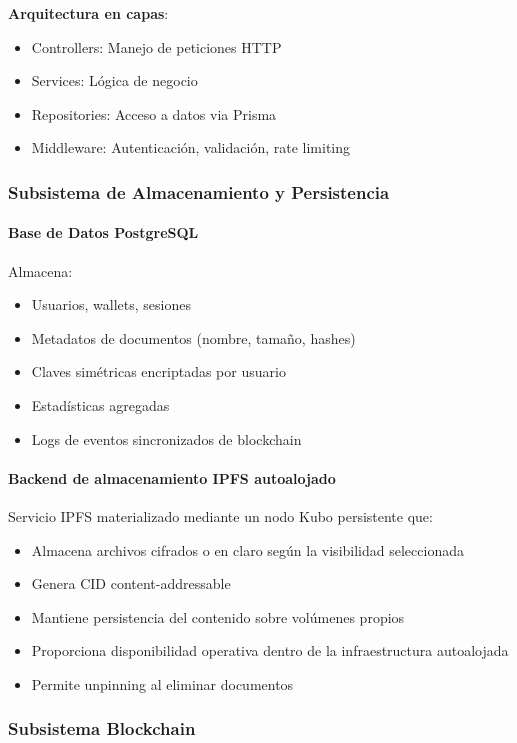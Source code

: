 \documentclass[11pt, a4paper]{article}
\begin{document}
\textbf{Arquitectura en capas}:
\begin{itemize}
    \item Controllers: Manejo de peticiones HTTP
    \item Services: Lógica de negocio
    \item Repositories: Acceso a datos via Prisma
    \item Middleware: Autenticación, validación, rate limiting
\end{itemize}

\subsubsection{Subsistema de Almacenamiento y Persistencia}

\paragraph{Base de Datos PostgreSQL}
Almacena:
\begin{itemize}
    \item Usuarios, wallets, sesiones
    \item Metadatos de documentos (nombre, tamaño, hashes)
    \item Claves simétricas encriptadas por usuario
    \item Estadísticas agregadas
    \item Logs de eventos sincronizados de blockchain
\end{itemize}

\paragraph{Backend de almacenamiento IPFS autoalojado}
Servicio IPFS materializado mediante un nodo Kubo persistente que:
\begin{itemize}
    \item Almacena archivos cifrados o en claro según la visibilidad seleccionada
    \item Genera CID content-addressable
    \item Mantiene persistencia del contenido sobre volúmenes propios
    \item Proporciona disponibilidad operativa dentro de la infraestructura autoalojada
    \item Permite unpinning al eliminar documentos
\end{itemize}

\subsubsection{Subsistema Blockchain}
\end{document}
